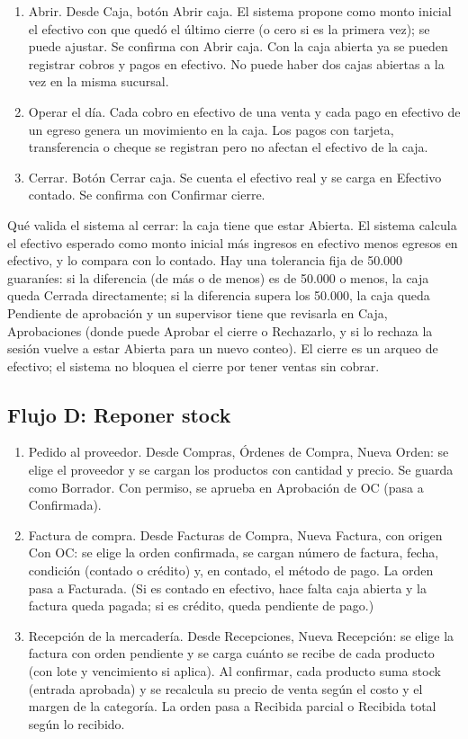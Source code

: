 \begin{enumerate}
  \item Abrir. Desde Caja, botón Abrir caja. El sistema propone como monto inicial el efectivo con que quedó el último cierre (o cero si es la primera vez); se puede ajustar. Se confirma con Abrir caja. Con la caja abierta ya se pueden registrar cobros y pagos en efectivo. No puede haber dos cajas abiertas a la vez en la misma sucursal.
  \item Operar el día. Cada cobro en efectivo de una venta y cada pago en efectivo de un egreso genera un movimiento en la caja. Los pagos con tarjeta, transferencia o cheque se registran pero no afectan el efectivo de la caja.
  \item Cerrar. Botón Cerrar caja. Se cuenta el efectivo real y se carga en Efectivo contado. Se confirma con Confirmar cierre.
\end{enumerate}

Qué valida el sistema al cerrar: la caja tiene que estar Abierta. El sistema calcula el efectivo esperado como monto inicial más ingresos en efectivo menos egresos en efectivo, y lo compara con lo contado. Hay una tolerancia fija de 50.000 guaraníes: si la diferencia (de más o de menos) es de 50.000 o menos, la caja queda Cerrada directamente; si la diferencia supera los 50.000, la caja queda Pendiente de aprobación y un supervisor tiene que revisarla en Caja, Aprobaciones (donde puede Aprobar el cierre o Rechazarlo, y si lo rechaza la sesión vuelve a estar Abierta para un nuevo conteo). El cierre es un arqueo de efectivo; el sistema no bloquea el cierre por tener ventas sin cobrar.

\subsection{Flujo D: Reponer stock}
\label{sec:mu-flujo-d}

\begin{enumerate}
  \item Pedido al proveedor. Desde Compras, Órdenes de Compra, Nueva Orden: se elige el proveedor y se cargan los productos con cantidad y precio. Se guarda como Borrador. Con permiso, se aprueba en Aprobación de OC (pasa a Confirmada).
  \item Factura de compra. Desde Facturas de Compra, Nueva Factura, con origen Con OC: se elige la orden confirmada, se cargan número de factura, fecha, condición (contado o crédito) y, en contado, el método de pago. La orden pasa a Facturada. (Si es contado en efectivo, hace falta caja abierta y la factura queda pagada; si es crédito, queda pendiente de pago.)
  \item Recepción de la mercadería. Desde Recepciones, Nueva Recepción: se elige la factura con orden pendiente y se carga cuánto se recibe de cada producto (con lote y vencimiento si aplica). Al confirmar, cada producto suma stock (entrada aprobada) y se recalcula su precio de venta según el costo y el margen de la categoría. La orden pasa a Recibida parcial o Recibida total según lo recibido.
\end{enumerate}

